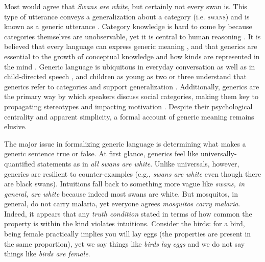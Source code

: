 \documentclass[12pt,letterpaper]{article}
\begin{document}
\newpage

Most would agree that \emph{Swans are white}, but certainly not every swan is.
This type of utterance conveys a generalization about a category (i.e. \textsc{swans}) and is known as a generic utterance \cite{Carlson1977,Leslie2008}.
Category knowledge is hard to come by because categories themselves are unobservable, yet it is central to human reasoning \cite{Markman1989}.
It is believed that every language can express generic meaning \cite{Behrens2005,Carlson1995}, and that generics are essential to the growth of conceptual knowledge \cite{Gelman2004} and how kinds are represented in the mind \cite{Leslie2008}.
Generic language is ubiquitous in everyday conversation as well as in child-directed speech \cite{Gelman2008}, and children as young as two or three understand that generics refer to categories and support generalization \cite{Cimpian2008}.
Additionally, generics are the primary way by which speakers discuss social categories, making them key to propagating stereotypes \cite{GelmanEtAl2004,Rhodes2012,Leslie2015} and impacting motivation \cite{Cimpian2010motivation}.
Despite their psychological centrality and apparent simplicity, a formal account of generic meaning remains elusive.

The major issue in formalizing generic language is determining what makes a generic sentence true or false.
At first glance, generics feel like universally-quantified statements as in \emph{all swans are white}. 
Unlike universals, however, generics are resilient to counter-examples (e.g., \emph{swans are white} even though there are black swans). 
Intuitions fall back to something more vague like \emph{swans, in general, are white} because indeed most swans are white.
But mosquitos, in general, do not carry malaria, yet everyone agrees \emph{mosquitos carry malaria}.
Indeed, it appears that any \emph{truth condition} stated in terms of how common the property is within the kind violates intuitions.
Consider the birds: for a bird, being female practically implies you will lay eggs (the properties are present in the same proportion), yet we say things like \emph{birds lay eggs} and we do not say things like \emph{birds are female}.
\end{document}
